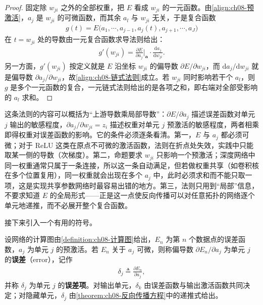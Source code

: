 \documentclass[../../main.tex]{subfiles}
\begin{document}
\begin{proof}
固定除 $w_{ji}$ 之外的全部权重，把 $E$ 看成 $w_{ji}$ 的一元函数。由\eqref{align:ch08-预激活}，$a_j$ 是 $w_{ji}$ 的可微函数，而其余 $a_l$ 与 $w_{ji}$ 无关，于是复合函数
\begin{align*}
g(t)=E\bigl(a_1,\cdots,a_{j-1},a_j(t),a_{j+1},\cdots,a_J\bigr)
\end{align*}
在 $t=w_{ji}$ 处的导数由一元复合函数求导法则给出：
\begin{align*}
g'(w_{ji})=\frac{\partial E}{\partial a_j}\Big|_{\mathbf{a}}\cdot\frac{\mathrm{d}a_j}{\mathrm{d}w_{ji}}.
\end{align*}
另一方面，$g'(w_{ji})$ 按定义就是 $E$ 沿坐标 $w_{ji}$ 的偏导数 $\partial E/\partial w_{ji}$，而 $\mathrm{d}a_j/\mathrm{d}w_{ji}$ 就是偏导数 $\partial a_j/\partial w_{ji}$，故\eqref{align:ch08-链式法则}成立。若 $w_{ji}$ 同时影响若干个 $a_l$，则 $g$ 是多个一元函数的复合，一元链式法则给出的是各项之和，即右端对全部受影响的 $a_l$ 求和。
\end{proof}

\begin{remark}
这条法则的内容可以概括为“上游导数乘局部导数”：$\partial E/\partial a_j$ 描述误差函数对单元 $j$ 输出的敏感程度，$\partial a_j/\partial w_{ji}=z_i$ 描述权重对单元 $j$ 预激活的敏感程度，两者相乘即得权重对误差函数的影响。它的条件必须逐条看清。第一，$E$ 与 $a_j$ 都必须可微；对于 ReLU 这类在原点不可微的激活函数，法则在折点处失效，实践中只能取某一侧的导数（次梯度）。第二，命题要求 $w_{ji}$ 只影响一个预激活；深度网络中同一权重通常只属于一条连接，所以这一条自动满足，但若做权重共享（如卷积核在多个位置复用），同一权重就会出现在多个 $a_j$ 中，此时必须求和而不能只取一项，这是实现共享参数网络时最容易出错的地方。第三，法则只用到“局部”信息，不要求知道 $E$ 的全局形式——正是这一点使反向传播可以对任意拓扑的网络逐个单元地递推，而不必展开整个复合函数。
\end{remark}

接下来引入一个有用的符号。

\begin{definition}[误差项]\label{definition:ch08-误差项}
设网络的计算图由\cref{definition:ch08-计算图}给出，$E_n$ 为第 $n$ 个数据点的误差函数，$a_j$ 为单元 $j$ 的预激活。若 $E_n$ 关于 $a_j$ 可微，则称偏导数 $\partial E_n/\partial a_j$ 为单元 $j$ 的\textbf{误差}（error），记作
\begin{align}
\delta_j\triangleq\frac{\partial E_n}{\partial a_j},
\label{align:ch08-误差}
\end{align}
并称 $\delta_j$ 为单元 $j$ 的\textbf{误差项}。对输出单元，$\delta_k$ 由误差函数与输出激活函数共同决定；对隐藏单元，$\delta_j$ 由\cref{theorem:ch08-反向传播方程}中的递推式给出。
\end{definition}
\end{document}
